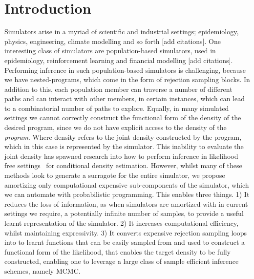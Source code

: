 \documentclass{article}
\begin{document}
\section{Introduction}
\label{sec:intro}
Simulators arise in a myriad of scientific and industrial settings; epidemiology, physics, engineering, climate modelling and so forth [add citations].
One interesting class of simulators are population-based simulators, used in epidemiology, reinforcement learning
and financial modelling [add citations].
Performing inference in such population-based simulators is challenging, because we have nested-programs, 
which come in the form of rejection sampling blocks. 
In addition to this, each population member can traverse a number of different paths and 
can interact with other members, in certain instances, which can lead to a combinatorial number of paths 
to explore. 
Equally, in many simulated settings we cannot correctly construct the functional form of the density of the desired program,
since we do not have explicit access to the density of the \emph{program}.
Where density refers to the joint density constructed by the program, which in this case is represented by the simulator.
This inability to evaluate the joint density has spawned research into how to perform 
inference in likelihood free settings~\cite{greenberg2019automatic, mohamed2016learning, papamakarios2018sequential,brehmer2018mining}
for conditional density estimation. However, whilst many of these methods look to generate a surragote 
for the entire simulator, we propose amortizing only computational expensive sub-components 
of the simulator, which we can automate with probabilistic programming. 
This enables three things. 
1) It reduces the loss of information, as when simulators are amortized with in current
settings we require, a potentially infinite number of samples, to provide a useful learnt representation of the simulator. 
2) It increases computational efficiency, whilst maintaining expressivity. 
3) It converts expensive rejection sampling loops into to learnt functions that can be 
easily sampled from and used to construct a functional form of the likelihood, that enables the 
target density to be fully constructed, enabling one to leverage a large class of sample efficient inference schemes, namely MCMC.
\end{document}
